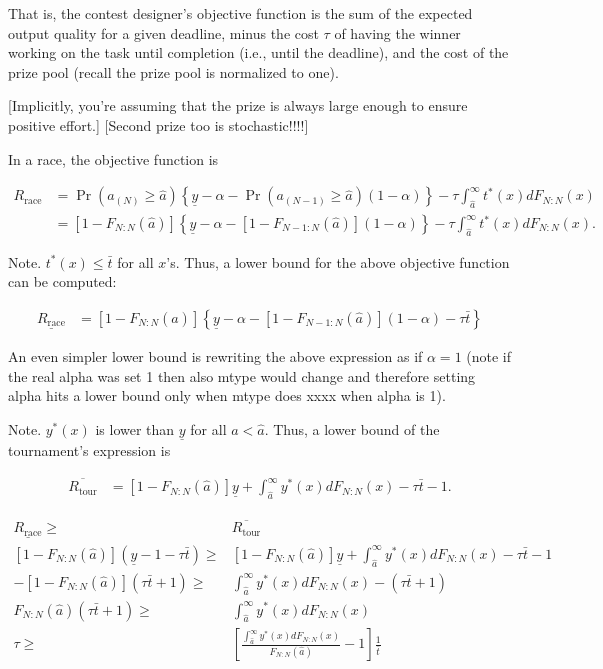 \documentclass[11pt, titlepage]{article}
\newcommand\deadline{\bar{t}}
\newcommand\target{\underline{y}}
\newcommand\race{\text{race}}
\newcommand\tournament{\text{tour}}
\newcommand\mtype{\hat{a}}
\begin{document}
That is, the contest designer's objective function is the sum of the
expected output quality for a given deadline, minus the cost \(\tau\) of
having the winner working on the task until completion (i.e., until the
deadline), and the cost of the prize pool (recall the prize pool is
normalized to one).

{[}Implicitly, you're assuming that the prize is always large enough to
ensure positive effort.{]} {[}Second prize too is stochastic!!!!{]}

In a race, the objective function is

\begin{align}
R_\race & =  
  \Pr(a_{(N)}\geq \mtype) \left\{\target - \alpha -
  \Pr(a_{(N-1)}\geq \mtype) (1-\alpha) \right\}
  - \tau \int_{\mtype}^{\infty} t^*(x) dF_{N:N}(x) \nonumber\\
  & = [1-F_{N:N}(\mtype)] \left\{\target - \alpha -
  [1-F_{N-1:N}(\mtype)] (1 - \alpha) \right\}
  - \tau \int_{\mtype}^{\infty} t^*(x) dF_{N:N}(x).
\end{align}

Note. \(t^*(x) \leq \deadline\) for all \(x\)'s. Thus, a lower bound for
the above objective function can be computed:

\begin{align}
\underline {R_\race} & = 
  [1-F_{N:N}(\mtype)] \left\{\target - \alpha -
  [1-F_{N-1:N}(\mtype)] (1 - \alpha) - \tau \deadline\right\}
\end{align}

An even simpler lower bound is rewriting the above expression as if
\(\alpha=1\) (note if the real alpha was set 1 then also mtype would
change and therefore setting alpha hits a lower bound only when mtype
does xxxx when alpha is 1).

Note. \(y^*(x)\) is lower than \(\target\) for all \(a < \mtype\). Thus,
a lower bound of the tournament's expression is

\begin{align}
\overline {R_\tournament} & = 
  [1-F_{N:N}(\mtype)] \target + \int_{\mtype}^\infty y^*(x) dF_{N:N}(x) 
  - \tau \deadline - 1. 
\end{align}

\begin{align}
  \underline {R_\race} \geq & \overline {R_\tournament} \nonumber\\
  [1-F_{N:N}(\mtype)] (\target - 1 - \tau \deadline) \geq &
  [1-F_{N:N}(\mtype)] \target + \int_{\mtype}^\infty y^*(x) dF_{N:N}(x) 
  - \tau \deadline - 1 \nonumber\\
  - [1-F_{N:N}(\mtype)] (\tau\deadline + 1) \geq &
  \int_{\mtype}^\infty y^*(x) dF_{N:N}(x) 
  - (\tau \deadline + 1) \nonumber\\
  F_{N:N}(\mtype) (\tau \deadline + 1) \geq &
  \int_{\mtype}^\infty y^*(x) dF_{N:N}(x) \nonumber\\
  \tau \geq & 
    \left[
      \frac{\int_{\mtype}^\infty y^*(x) dF_{N:N}(x)}{F_{N:N}(\mtype)} -1 
    \right] \frac{1}{\deadline}
\end{align}
\end{document}
